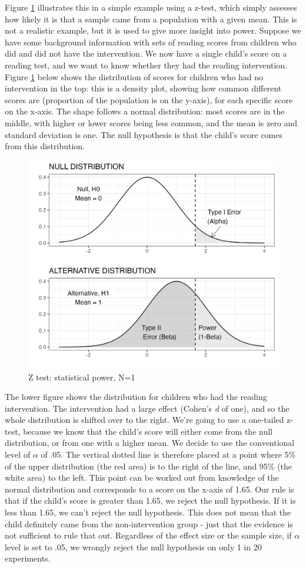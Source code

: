 \documentclass{krantz}
\begin{document}
Figure \ref{fig:densplot} illustrates this in a simple example using a z-test, which simply assesses how likely it is that a sample came from a population with a given mean. This is not a realistic example, but it is used to give more insight into power. Suppose we have some background information with sets of reading scores from children who did and did not have the intervention. We now have a single child's score on a reading test, and we want to know whether they had the reading intervention. Figure \ref{fig:densplot} below shows the distribution of scores for children who had no intervention in the top: this is a density plot, showing how common different scores are (proportion of the population is on the y-axis), for each specific score on the x-axis. The shape follows a normal distribution: most scores are in the middle, with higher or lower scores being less common, and the mean is zero and standard deviation is one. The null hypothesis is that the child's score comes from this distribution.


\begin{figure}
\includegraphics[width=0.75\linewidth]{images_bw/densplot1} \caption{Z test: statistical power, N=1}\label{fig:densplot}
\end{figure}


The lower figure shows the distribution for children who had the reading intervention. The intervention had a large effect (Cohen's \emph{d} of one), and so the whole distribution is shifted over to the right. We're going to use a one-tailed z-test, because we know that the child's score will either come from the null distribution, or from one with a higher mean. We decide to use the conventional level of \(\alpha\) of .05. The vertical dotted line is therefore placed at a point where 5\% of the upper distribution (the red area) is to the right of the line, and 95\% (the white area) to the left. This point can be worked out from knowledge of the normal distribution and corresponds to a score on the x-axis of 1.65. Our rule is that if the child's score is greater than 1.65, we reject the null hypothesis. If it is less than 1.65, we can't reject the null hypothesis. This does not mean that the child definitely came from the non-intervention group - just that the evidence is not sufficient to rule that out. Regardless of the effect size or the sample size, if \(\alpha\) level is set to .05, we wrongly reject the null hypothesis on only 1 in 20 experiments.
\end{document}
